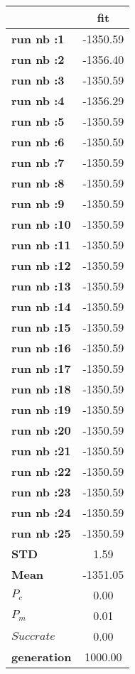 \begin{tiny}\begin{tabular}{|l|c|}
\hline
&\textbf{fit}\\\hline
\textbf{run nb :1}&-1350.59\\\hline
\textbf{run nb :2}&-1356.40\\\hline
\textbf{run nb :3}&-1350.59\\\hline
\textbf{run nb :4}&-1356.29\\\hline
\textbf{run nb :5}&-1350.59\\\hline
\textbf{run nb :6}&-1350.59\\\hline
\textbf{run nb :7}&-1350.59\\\hline
\textbf{run nb :8}&-1350.59\\\hline
\textbf{run nb :9}&-1350.59\\\hline
\textbf{run nb :10}&-1350.59\\\hline
\textbf{run nb :11}&-1350.59\\\hline
\textbf{run nb :12}&-1350.59\\\hline
\textbf{run nb :13}&-1350.59\\\hline
\textbf{run nb :14}&-1350.59\\\hline
\textbf{run nb :15}&-1350.59\\\hline
\textbf{run nb :16}&-1350.59\\\hline
\textbf{run nb :17}&-1350.59\\\hline
\textbf{run nb :18}&-1350.59\\\hline
\textbf{run nb :19}&-1350.59\\\hline
\textbf{run nb :20}&-1350.59\\\hline
\textbf{run nb :21}&-1350.59\\\hline
\textbf{run nb :22}&-1350.59\\\hline
\textbf{run nb :23}&-1350.59\\\hline
\textbf{run nb :24}&-1350.59\\\hline
\textbf{run nb :25}&-1350.59\\\hline
\textbf{STD}&1.59\\\hline
\textbf{Mean}&-1351.05\\\hline
\textbf{$P_c$}&0.00\\\hline
\textbf{$P_{m}$}&0.01\\\hline
\textbf{$Succ rate$}&0.00\\\hline
\textbf{generation}&1000.00\\\hline
\end{tabular}
\end{tiny}